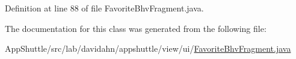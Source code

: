 \-Definition at line 88 of file \-Favorite\-Bhv\-Fragment.\-java.



\-The documentation for this class was generated from the following file\-:\begin{DoxyCompactItemize}
\item 
\-App\-Shuttle/src/lab/davidahn/appshuttle/view/ui/\hyperlink{_favorite_bhv_fragment_8java}{\-Favorite\-Bhv\-Fragment.\-java}\end{DoxyCompactItemize}
